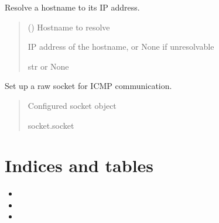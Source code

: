 \documentclass[letterpaper,10pt,english]{sphinxmanual}
\begin{document}

\begin{fulllineitems}
\label{\detokenize{utils:utils.resolve_hostname}}
\pysigstartsignatures
\pysiglinewithargsret
{}
{}
{}
\pysigstopsignatures
\sphinxAtStartPar
Resolve a hostname to its IP address.
\begin{quote}\begin{description}
\sphinxAtStartPar
{} () \textendash{} Hostname to resolve

\sphinxAtStartPar
IP address of the hostname, or None if unresolvable

\sphinxAtStartPar
str or None

\end{description}\end{quote}

\end{fulllineitems}


\begin{fulllineitems}
\label{\detokenize{utils:utils.setup_socket}}
\pysigstartsignatures
\pysiglinewithargsret
{}
{}
{}
\pysigstopsignatures
\sphinxAtStartPar
Set up a raw socket for ICMP communication.
\begin{quote}\begin{description}
\sphinxAtStartPar
Configured socket object

\sphinxAtStartPar
socket.socket

\end{description}\end{quote}

\end{fulllineitems}



\chapter{Indices and tables}
\label{\detokenize{index:indices-and-tables}}\begin{itemize}
\item {} 
\sphinxAtStartPar
{}

\item {} 
\sphinxAtStartPar
{}

\item {} 
\sphinxAtStartPar
{}

\end{itemize}
\end{document}
